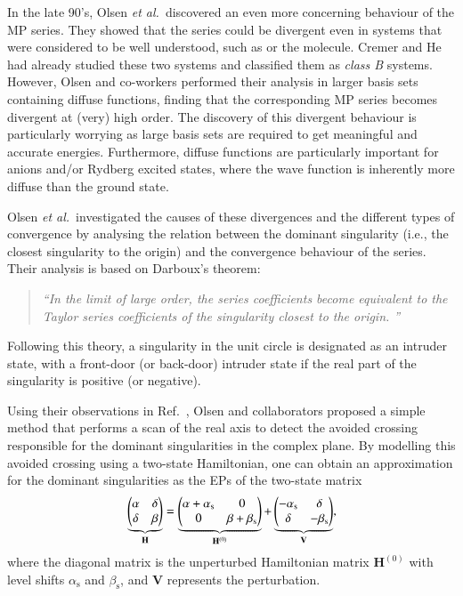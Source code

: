 \documentclass[aps,prb,reprint,noshowkeys,superscriptaddress]{revtex4-1}
\newcommand{\latin}[1]{#1}
\newcommand{\ie}{\latin{i.e.}}
\newcommand{\etal}{\textit{et al.}}
\newcommand{\bH}{\mathbf{H}}
\newcommand{\bV}{\mathbf{V}}
\begin{document}
In the late 90's, Olsen \etal\ discovered an even more concerning behaviour of the MP series. \cite{Olsen_1996} 
They showed that the series could be divergent even in systems that were considered to be well understood, 
such as  or the  molecule. \cite{Olsen_1996, Christiansen_1996} 
Cremer and He had already studied these two systems and classified them as \textit{class B} systems.\cite{Cremer_1996} 
However, Olsen and co-workers performed their analysis in larger basis sets containing diffuse functions,
finding that the corresponding MP series becomes divergent at (very) high order.
The discovery of this divergent behaviour is particularly worrying as large basis sets 
are required to get meaningful and accurate energies.\cite{Loos_2019d,Giner_2019}
Furthermore, diffuse functions are particularly important for anions and/or Rydberg excited states, where the wave function 
is inherently more diffuse than the ground state.\cite{Loos_2018a,Loos_2020a}

Olsen \etal\ investigated the causes of these divergences and the different types of convergence by
analysing the relation between the dominant singularity (\ie, the closest singularity to the origin) 
and the convergence behaviour of the series.\cite{Olsen_2000} 
Their analysis is based on Darboux's theorem: \cite{Goodson_2011}
\begin{quote}
\textit{``In the limit of large order, the series coefficients become equivalent to 
    the Taylor series coefficients of the singularity closest to the origin. ''}
\end{quote}
Following this theory, a singularity in the unit circle is designated as an intruder state, 
with a front-door (or back-door) intruder state if the real part of the singularity is positive (or negative).

Using their observations in Ref.~, Olsen and collaborators proposed 
a simple method that performs a scan of the real axis to detect the avoided crossing responsible 
for the dominant singularities in the complex plane. \cite{Olsen_2000} 
By modelling this avoided crossing using a two-state Hamiltonian, one can obtain an approximation for
the dominant singularities as the EPs of the two-state matrix
\begin{equation}
	\label{eq:Olsen_2x2}
    \underbrace{\mqty(\alpha & \delta \\ \delta & \beta )}_{\bH} 
    = \underbrace{\mqty(\alpha + \alpha_{\text{s}} & 0 \\ 0 & \beta + \beta_{\text{s}} )}_{\bH^{(0)}} 
    + \underbrace{\mqty( -\alpha_{\text{s}} & \delta \\ \delta & - \beta_{\text{s}})}_{\bV},
\end{equation}
where the diagonal matrix is the unperturbed Hamiltonian matrix $\bH^{(0)}$ with level shifts
$\alpha_{\text{s}}$ and $\beta_{\text{s}}$, and $\bV$ represents the perturbation.
\end{document}
